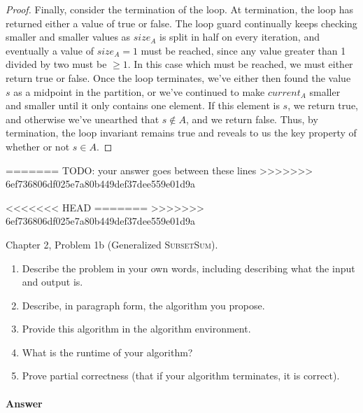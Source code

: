 \documentclass{article}
\begin{document}
\begin{enumerate}
\begin{proof}
			Finally, consider the termination of the loop. At termination, the loop has returned either
			a value of true or false. The loop guard continually keeps checking smaller and smaller values as $size_A$ is split in half
			on every iteration, and eventually a value of $size_A=1$ must be reached, since any value greater than 1 divided by two must 
			be $\geq 1$. In this case which must be reached, we must either return true or false. Once the loop terminates, we've either 
			then found the value $s$ as a midpoint in the partition, or we've
			continued to make $current_A$ smaller and smaller until it only contains one element. If this element is $s$, we return true, and
			otherwise we've unearthed that $s \not \in A$, and we return false. Thus, by termination, the loop invariant remains true and
			reveals to us the key property of whether or not $s \in A$.
		\end{proof}


\end{enumerate}

=======
TODO: your answer goes between these lines
>>>>>>> 6ef736806df025e7a80b449def37dee559e01d9a


\nextprob
<<<<<<< HEAD
=======
>>>>>>> 6ef736806df025e7a80b449def37dee559e01d9a

Chapter 2, Problem 1b (Generalized \textsc{SubsetSum}).
\begin{enumerate}
    \item Describe the problem in your own words, including
        describing what the input and output is.
    \item Describe, in paragraph form, the algorithm you propose.
    \item Provide this algorithm in the algorithm environment.
    \item What is the runtime of your algorithm?
    \item Prove partial correctness (that if your algorithm terminates, it is
        correct).
\end{enumerate}



\paragraph{Answer}

\end{document}
